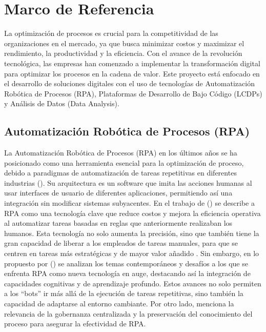 \documentclass[letter,oneside,12pt,spanish]{report}
\begin{document}
\newpage

\chapter{Marco de Referencia}
\label{sec:marco-referencia}

\noindent La optimización de procesos es crucial para la competitividad de las organizaciones en el mercado, ya que busca minimizar costos y maximizar el rendimiento, la productividad y la eficiencia. Con el avance de la revolución tecnológica, las empresas han comenzado a implementar la transformación digital para optimizar los procesos en la cadena de valor. Este proyecto está enfocado en el desarrollo de soluciones digitales con el uso de tecnologías de Automatización Robótica de Procesos (RPA), Plataformas de Desarrollo de Bajo Código (LCDPs) y Análisis de Datos (Data Analysis).

\section{Automatización Robótica de Procesos (RPA)}

\noindent La Automatización Robótica de Procesos (RPA) en los últimos años se ha posicionado como una herramienta esencial para la optimización de proceso, debido a paradigmas de automatización de tareas repetitivas en diferentes industrias (\cite{doguc2020rpa}). Su arquitectura es un software que imita las acciones humanas al usar interfaces de usuario de diferentes aplicaciones, permitiendo así una integración sin modificar sistemas subyacentes. En el trabajo de (\cite{doguc2020rpa}) se describe a RPA como una tecnología clave que reduce costos y mejora la eficiencia operativa al automatizar tareas basadas en reglas que anteriormente realizaban los humanos. Esta tecnología no solo aumenta la precisión, sino que también tiene la gran capacidad de liberar a los empleados de tareas manuales, para que se centren en tareas más estratégicas y de mayor valor añadido . Sin embargo, en lo propuesto por (\cite{syed2020rpa}) se analizan los temas contemporáneos y desafíos a los que se enfrenta RPA como nueva tecnología en auge, destacando así la integración de capacidades cognitivas y de aprendizaje profundo. Estos avances no solo permiten a los “bots” ir más allá de la ejecución de tareas repetitivas, sino también la capacidad de adaptarse al entorno cambiante. Por otro lado, menciona la relevancia de la gobernanza centralizada y la preservación del conocimiento del proceso para asegurar la efectividad de RPA. 
\end{document}
